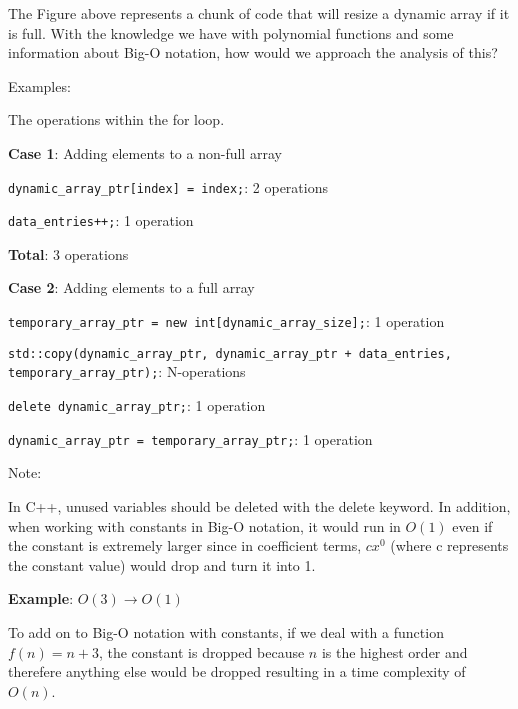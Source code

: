 \documentclass[11pt,a4paper,english]{paper}
\begin{document}
\bigskip 

\noindent The Figure above represents a chunk of code that will resize a dynamic array if it is full. With the knowledge we have with polynomial functions and some information about Big-O notation, how would we approach the analysis of this?
\bigskip

\begin{bluebox} {Examples: } {

  The operations within the for loop.

    \textbf{Case 1}: Adding elements to a non-full array

    \begin{itemize} {
      
        \item \texttt{dynamic_array_ptr[index] = index;}: 2 operations
      \item \texttt{data_entries++;}: 1 operation
        \item \textbf{Total}: 3 operations

    }\end{itemize}

    \textbf{Case 2}: Adding elements to a full array

    \begin{itemize} {

        \item \texttt{temporary_array_ptr = new int[dynamic_array_size];}: 1 operation
        \item \texttt{std::copy(dynamic_array_ptr, dynamic_array_ptr + data_entries, temporary_array_ptr);}: N-operations
        \item \texttt{delete dynamic_array_ptr;}: 1 operation
        \item \texttt{dynamic_array_ptr = temporary_array_ptr;}: 1 operation 

    }\end{itemize}
  }
\end{bluebox}

\begin{mybox} {Note:} {

    In C++, unused variables should be deleted with the delete keyword. In addition, when working with constants in Big-O notation, it would run in $O(1)$ even if the constant is extremely larger since in coefficient terms, $cx^0$ (where c represents the constant value) would drop and turn it into 1.

    \bigskip

    \textbf{Example}: $O(3) \rightarrow O(1)$


  }
\end{mybox}

\bigskip

\noindent To add on to Big-O notation with constants, if we deal with a function $f(n) = n + 3$, the constant is dropped because $n$ is the highest order and therefere anything else would be dropped resulting in a time complexity of $O(n)$.
\end{document}
